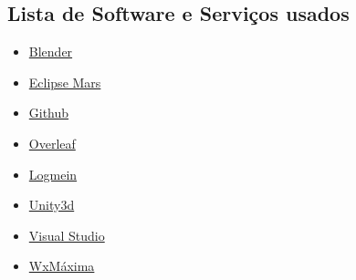 
\subsection{Lista de Software e Serviços usados}

\begin{itemize}
\item \href{https://www.blender.org/}{Blender}
\item \href{https://eclipse.org/mars/}{Eclipse Mars} 
\item \href{https://github.com/}{Github}
\item \href{https://www.overleaf.com}{Overleaf}
\item \href{https://secure.logmein.com/home/pt}{Logmein}
\item \href{https://unity3d.com/pt}{Unity3d}
\item \href{https://www.visualstudio.com/}{Visual Studio}
\item \href{http://andrejv.github.io/wxmaxima/}{WxMáxima}
\end{itemize}